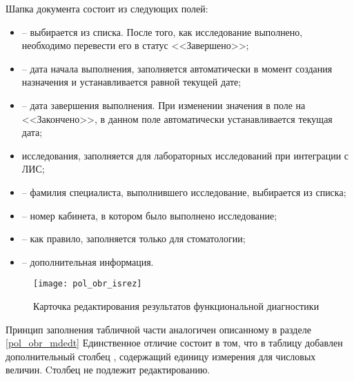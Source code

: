 Шапка документа состоит из следующих полей:
\begin{itemize}
 \item {} – выбирается из списка. После того, как  исследование выполнено, необходимо перевести его в статус <<Завершено>>;
 \item {} – дата начала выполнения, заполняется автоматически в момент создания назначения и устанавливается равной текущей дате;
 \item {} – дата завершения выполнения. При изменении значения в поле  на <<Закончено>>, в данном поле автоматически устанавливается текущая дата;
 \item {} исследования, заполняется для лабораторных исследований при интеграции с ЛИС;
 \item {} – фамилия специалиста, выполнившего исследование, выбирается из списка;
 \item {} – номер кабинета, в котором было выполнено исследование;
 \item {} – как правило, заполняется только для стоматологии;
 \item {} – дополнительная информация.
\end{itemize}

 \begin{figure}[ht]\centering
   \texttt{[image: pol\_obr\_isrez]}
   \caption{Карточка редактирования результатов функциональной диагностики}
   \label{img_pol_obr_isrez}
 \end{figure}
 
Принцип заполнения табличной части аналогичен описанному в разделе \ref{pol_obr_mdedt} Единственное отличие состоит в том, что в таблицу добавлен дополнительный столбец , содержащий единицу измерения для числовых величин. Cтолбец  не подлежит редактированию.



